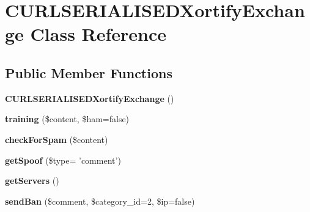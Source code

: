\hypertarget{class_c_u_r_l_s_e_r_i_a_l_i_s_e_d_xortify_exchange}{\section{C\-U\-R\-L\-S\-E\-R\-I\-A\-L\-I\-S\-E\-D\-Xortify\-Exchange Class Reference}
\label{class_c_u_r_l_s_e_r_i_a_l_i_s_e_d_xortify_exchange}
}
\subsection*{Public Member Functions}
\begin{DoxyCompactItemize}
\item 
\hypertarget{class_c_u_r_l_s_e_r_i_a_l_i_s_e_d_xortify_exchange_adb757a7ac2bce7cd20ce86b986e7e997}{{\bfseries C\-U\-R\-L\-S\-E\-R\-I\-A\-L\-I\-S\-E\-D\-Xortify\-Exchange} ()}\label{class_c_u_r_l_s_e_r_i_a_l_i_s_e_d_xortify_exchange_adb757a7ac2bce7cd20ce86b986e7e997}

\item 
\hypertarget{class_c_u_r_l_s_e_r_i_a_l_i_s_e_d_xortify_exchange_a9de0fa2c683bf3adde0752d59c72557c}{{\bfseries training} (\$content, \$ham=false)}\label{class_c_u_r_l_s_e_r_i_a_l_i_s_e_d_xortify_exchange_a9de0fa2c683bf3adde0752d59c72557c}

\item 
\hypertarget{class_c_u_r_l_s_e_r_i_a_l_i_s_e_d_xortify_exchange_adbaa05b130e865c21755db6e8b2ab4de}{{\bfseries check\-For\-Spam} (\$content)}\label{class_c_u_r_l_s_e_r_i_a_l_i_s_e_d_xortify_exchange_adbaa05b130e865c21755db6e8b2ab4de}

\item 
\hypertarget{class_c_u_r_l_s_e_r_i_a_l_i_s_e_d_xortify_exchange_a18d81872db2d0cee7cd19397261ce4bd}{{\bfseries get\-Spoof} (\$type= 'comment')}\label{class_c_u_r_l_s_e_r_i_a_l_i_s_e_d_xortify_exchange_a18d81872db2d0cee7cd19397261ce4bd}

\item 
\hypertarget{class_c_u_r_l_s_e_r_i_a_l_i_s_e_d_xortify_exchange_a8350814e2f83c2ff5c907a6d288c245c}{{\bfseries get\-Servers} ()}\label{class_c_u_r_l_s_e_r_i_a_l_i_s_e_d_xortify_exchange_a8350814e2f83c2ff5c907a6d288c245c}

\item 
\hypertarget{class_c_u_r_l_s_e_r_i_a_l_i_s_e_d_xortify_exchange_a2a01fa012b242ffd3bb8e4affec08894}{{\bfseries send\-Ban} (\$comment, \$category\-\_\-id=2, \$ip=false)}\label{class_c_u_r_l_s_e_r_i_a_l_i_s_e_d_xortify_exchange_a2a01fa012b242ffd3bb8e4affec08894}


\end{DoxyCompactItemize}

